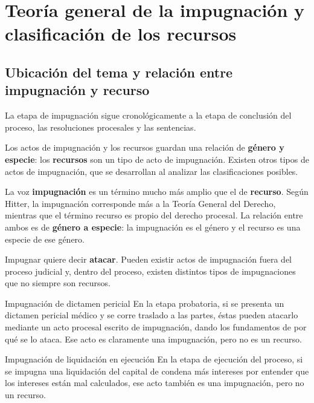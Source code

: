 \documentclass[12pt,oneside]{book}
\begin{document}
\chapter[Teoría general de la impugnación]{Teoría general de la impugnación y clasificación de los recursos}\label{cap:impugnacion}

\section{Ubicación del tema y relación entre impugnación y recurso}

La etapa de impugnación sigue cronológicamente a la etapa de conclusión del proceso, las resoluciones procesales y las sentencias.

Los actos de impugnación y los recursos guardan una relación de \textbf{género y especie}: los \textbf{recursos} son un tipo de acto de impugnación. Existen otros tipos de actos de impugnación, que se desarrollan al analizar las clasificaciones posibles.

La voz \textbf{impugnaci\'on} es un t\'ermino mucho m\'as amplio que el de \textbf{recurso}. Seg\'un Hitter, la impugnaci\'on corresponde m\'as a la Teor\'ia General del Derecho, mientras que el t\'ermino recurso es propio del derecho procesal. La relaci\'on entre ambos es de \textbf{g\'enero a especie}: la impugnaci\'on es el g\'enero y el recurso es una especie de ese g\'enero.

Impugnar quiere decir \textbf{atacar}. Pueden existir actos de impugnaci\'on fuera del proceso judicial y, dentro del proceso, existen distintos tipos de impugnaciones que no siempre son recursos.

\begin{example}{Impugnaci\'on de dictamen pericial}
En la etapa probatoria, si se presenta un dictamen pericial m\'edico y se corre traslado a las partes, \'estas pueden atacarlo mediante un acto procesal escrito de impugnaci\'on, dando los fundamentos de por qu\'e se lo ataca. Ese acto es claramente una impugnaci\'on, pero no es un recurso.
\end{example}

\begin{example}{Impugnaci\'on de liquidaci\'on en ejecuci\'on}
En la etapa de ejecuci\'on del proceso, si se impugna una liquidaci\'on del capital de condena m\'as intereses por entender que los intereses est\'an mal calculados, ese acto tambi\'en es una impugnaci\'on, pero no un recurso.
\end{example}
\end{document}
